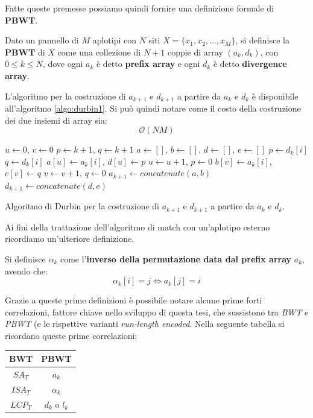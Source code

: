 Fatte queste premesse possiamo quindi fornire una definizione formale di
\textbf{PBWT}.
\begin{definizione}
  Dato un pannello di $M$ aplotipi con $N$
  siti $X=\{x_1,x_2,\ldots,x_M\}$, si definisce la \textbf{PBWT} di $X$ come una
  collezione di $N+1$ coppie di array $(a_k,d_k)$, con $0\leq k\leq N$, dove
  ogni $a_k$ è detto \textbf{prefix array} e ogni $d_k$ è detto
  \textbf{divergence array}.  
\end{definizione}
L'algoritmo per la costruzione di $a_{k+1}$ e $d_{k+1}$ a partire da $a_k$ e
$d_k$ è disponibile all'algoritmo \ref{algo:durbin1}. Si può quindi notare come
il costo della costruzione dei due insiemi di array sia:
\begin{equation}
  \label{eq:pbwtadtime}
  \mathcal{O}(NM)
\end{equation}
\begin{algorithm}
  \small
  \begin{algorithmic}[1]
    \State $u\gets 0$, $v\gets 0$
    \State $p\gets k+1$, $q\gets k+1$
    \State $a\gets []$, $b\gets []$, $d\gets []$, $e\gets []$
    \State $p\gets d_k[i]$
    \EndIf
    \State $q\gets d_k[i]$
    \EndIf
    \State $a[u]\gets a_k[i]$, $d[u]\gets p$
    \State $u\gets u+1$, $p\gets 0$
    \Else
    \State $b[v]\gets a_k[i]$, $e[v]\gets q$
    \State $v\gets v+1$, $q\gets 0$
    \EndIf
    \EndFor
    \State $a_{k+1}\gets concatenate(a,b)$
    \State $d_{k+1}\gets concatenate(d,e)$ 
    \EndFunction
  \end{algorithmic}
  \caption{Algoritmo di Durbin per la costruzione di $a_{k+1}$ e $d_{k+1}$ a
  partire da $a_{k}$ e $d_{k}$.}
  \label{algo:durbin1}
\end{algorithm}
Ai fini della trattazione dell'algoritmo di match con un'aplotipo esterno
ricordiamo un'ulteriore definizione.
\begin{definizione}
  Si definisce $\alpha_k$ come l'\textbf{inverso della permutazione data dal
    prefix array} $a_k$, avendo che:
  \[\alpha_k[i]=j \iff a_k[j]=i\]
\end{definizione}
Grazie a queste prime definizioni è possibile notare alcune prime forti
correlazioni, fattore chiave nello sviluppo di questa tesi, che sussistono tra
\textit{BWT} e \textit{PBWT} (e le rispettive varianti \textit{run-length
  encoded}. Nella seguente tabella si ricordano queste prime correlazioni:
\begin{table}[H]
  \centering
  \begin{tabular}{c|c}
    \textbf{BWT} & \textbf{PBWT}\\
    \hline
    $SA_T$ & $a_k$\\
    $ISA_T$ & $\alpha_k$\\
    $LCP_T$ & $d_k$ o $l_k$\\            
  \end{tabular}
\end{table}

